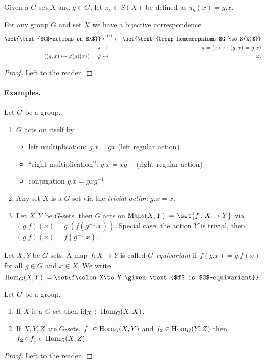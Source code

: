 \documentclass[12pt,a4paper]{scrartcl}
\begin{document}
\begin{otherlanguage}{english}
\begin{defi}
  Given a $G$-set $X$ and $g\in G$, let $\pi_g \in S(X)$ be defined as $\pi_g(x) = g.x$.
\end{defi}
\begin{lem}
  For any group $G$ and set $X$ we have a bijective correspondence
  \begin{eqnarray*}
    \set{\text{$G$-actions on $X$}} &\xlongleftrightarrow{1:1}& \set{\text{Group homomorphisms $G \to S(X)$}} \\
    \pi &\mapsto& \hat\pi = (x \mapsto \pi(g,x) = g.x) \\
    ((g,x)\mapsto \phi(g)(x))=\mathring \phi &\mapsfrom& \phi.
  \end{eqnarray*}
\end{lem}
\begin{proof}
  Left to the reader.
\end{proof}


\paragraph{Examples.}
Let $G$ be a group.
\begin{enumerate}
  \item $G$ acts on itself by
  \begin{itemize}
    \item left multiplication: $g.x = gx$ (left regular action)
    \item \enquote{right multiplication}: $g.x = xg^{-1}$ (right regular action)
    \item conjugation $g.x = gxg^{-1}$
  \end{itemize}
  \item Any set $X$ is a $G$-set via the \emph{trivial action} $g.x = x$.
  \item Let $X,Y$ be $G$-sets. then $G$ acts on $\Maps(X,Y) := \set{f\colon X\to Y}$ via $(g.f)(x) = g.(f(g^{-1}.x))$. Special case: the action $Y$ is trivial, then $(g.f)(x) = f(g^{-1}.x)$.
\end{enumerate}

\begin{defi}
  Let $X,Y$ be $G$-sets. A map $f\colon X\to Y$ is called \emph{$G$-equivariant} if $f(g.x) = g.f(x)$ for all $g\in G$ and $x \in X$. We write \[\Hom_G(X,Y) := \set{f\colon X\to Y \given \text{$f$ is $G$-equivariant}}.\]
\end{defi}
\begin{lem}
  Let $G$ be a group.
  \begin{enumerate}
    \item If $X$ is a $G$-set then $\operatorname{id}_X\in \operatorname{Hom}_G(X,X)$.
    \item If $X,Y,Z$ are $G$-sets, $f_1 \in \operatorname{Hom}_G(X,Y)$ and $f_2 \in \operatorname{Hom}_G(Y,Z)$ then $f_2 \circ f_1 \in \operatorname{Hom}_G(X,Z)$.
  \end{enumerate}
\end{lem}
\begin{proof}
  Left to the reader.
\end{proof}


\end{otherlanguage}
\end{document}
